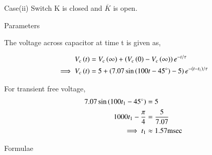 \documentclass[journal,12pt,twocolumn]{IEEEtran}
\begin{document}
\newpage
Case(ii) Switch K is closed and $\overline{K}$ is open.

\begin{figure}[h!]
  \centering
  \resizebox{0.55\columnwidth}{!}{}
\end{figure}

\begin{table}[ht]
    
    \caption{Parameters}
    \label{tab:Gate.ee.54.1}
\end{table}

The voltage across capacitor at time t is given as,

\begin{align}
    V_c\left(t\right) &= V_c\left(\infty\right)+\left(V_c\left(0\right)-V_c\left(\infty\right)\right)e^{-t/ \tau}\\
    \implies V_c\left(t\right) &= 5 + \left(7.07\sin \left(100t - 45^\circ\right)-5\right)e^{-\left(t-t_1\right)/ \tau}
\end{align}

For transient free voltage,
\begin{align}
    7.07\sin \left(100t_1 - 45^\circ\right) &= 5\\
    1000t_1 - \frac{\pi}{4} &= \frac{5}{7.07}\\
    \implies t_1 &\approx 1.57 \text{msec}
\end{align}

\begin{table}[ht]
    
    \caption{Formulae}
    \label{tab:Gate.ee.54.2}
\end{table}
\end{document}
